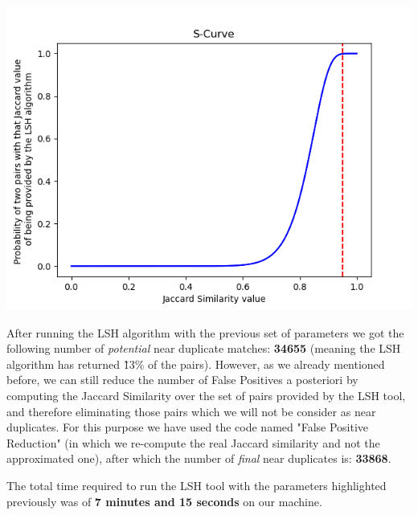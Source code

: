 \documentclass[12pt]{article}
\begin{document}
\begin{center}
\includegraphics[scale=.70]{Splot.png}
\end{center}

After running the LSH algorithm with the previous set of parameters we got the following number of \textit{potential} near duplicate matches: \textbf{34655} (meaning the LSH algorithm has returned \~13\% of the pairs). However, as we already mentioned before, we can still reduce the number of False Positives a posteriori by computing the Jaccard Similarity over the set of pairs provided by the LSH tool, and therefore eliminating those pairs which we will not be consider as near duplicates. For this purpose we have used the code named "False Positive Reduction" (in which we re-compute the real Jaccard similarity and not the approximated one), after which the number of \textit{final} near duplicates is: \textbf{33868}.

The total time required to run the LSH tool with the parameters highlighted previously was of \textbf{7 minutes and 15 seconds} on our machine.
\end{document}
